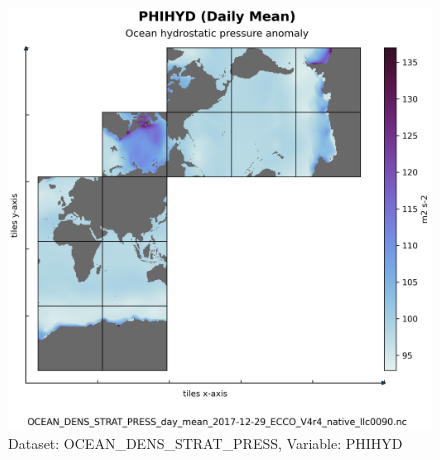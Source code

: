 \begin{figure}[H]
\centering
\includegraphics[scale=0.55]{../images/plots/native_plots/Ocean_Density_Stratification_and_Hydrostatic_Pressure/PHIHYD.png}
\caption{Dataset: OCEAN\_DENS\_STRAT\_PRESS, Variable: PHIHYD}
\label{tab:table-OCEAN_DENS_STRAT_PRESS_PHIHYD-Plot}
\end{figure}
\pagebreak
